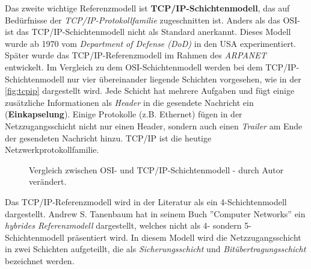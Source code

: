 Das zweite wichtige Referenzmodell ist \textbf{TCP/IP-Schichtenmodell}, das auf Bedürfnisse der \textit{TCP/IP-Protokollfamilie} zugeschnitten ist. Anders als das OSI- ist das TCP/IP-Schichtenmodell nicht als Standard anerkannt. Dieses Modell wurde ab 1970 vom \textit{Department of Defense (DoD)} in den USA experimentiert. Später wurde das TCP/IP-Referenzmodell im Rahmen des \textit{ARPANET} entwickelt. Im Vergleich zu dem OSI-Schichtenmodell werden bei dem TCP/IP-Schichtenmodell nur vier übereinander liegende Schichten vorgesehen, wie in der \autoref{fig:tcpip} dargestellt wird. Jede Schicht hat mehrere Aufgaben und fügt einige zusätzliche Informationen als \textit{Header} in die gesendete Nachricht ein (\textbf{Einkapselung}). Einige Protokolle (z.B. Ethernet) fügen in der Netzzugangsschicht nicht nur einen Header, sondern auch einen \textit{Trailer} am Ende der gesendeten Nachricht hinzu. TCP/IP ist die heutige Netzwerkprotokollfamilie. \smallskip \smallskip

\begin{figure}[htbp]
	\centering
	\caption[Vergleich zwischen OSI- und TCP/IP-Schichtenmodell]{Vergleich zwischen OSI- und TCP/IP-Schichtenmodell \cite{Jones:TCPIP} - durch Autor verändert.
	}\label{fig:tcpip}
\end{figure}

Das TCP/IP-Referenzmodell wird in der Literatur als ein 4-Schichtenmodell dargestellt. Andrew S. Tanenbaum hat in seinem Buch ''Computer Networks'' \cite{Tanenbaum:2010:CN:1942194} ein \textit{hybrides Referenzmodell} dargestellt, welches nicht als 4- sondern 5-Schichtenmodell präsentiert wird. In diesem Modell wird die Netzzugangsschicht in zwei Schichten aufgeteillt, die als \textit{Sicherungsschicht} und \textit{Bitübertragungsschicht} bezeichnet werden. \smallskip \smallskip


